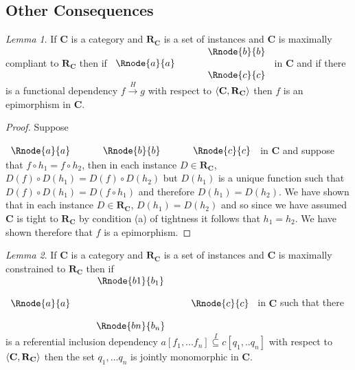 \documentclass[10pt,a4paper]{article}
\theoremstyle{remark}
\newtheorem*{lemma*}{Lemma}
\newcommand{\catc}[1][C]{\textbf{#1}}
\newcommand{\reqt}{\textbf{R}}
\newcommand{\reqtc}[1][\catc]{\reqt_{#1}}
\newcommand{\fundep}[3]{#2 \xrightarrow{#1} #3}
\begin{document}
\subsection{Other Consequences}

\begin{lemma*}
If $\catc$ is a category and $\reqtc$ is a set of instances and $\catc$ is maximally compliant to $\reqtc$
then if
$
\begin{array}{c p{0.5cm} c  }
             &&   \Rnode{b}{b} \\[0.01cm]
\Rnode{a}{a} &&                \\[0.01cm] 
             &&   \Rnode{c}{c}         
\end{array} 
$
in $\catc$ and if there is a functional dependency $\fundep{H}{f}{g}$ with respect to $\tuple{\catc,\reqtc}$ then 
$f$ is an epimorphism in $\catc$.
\end{lemma*}
\begin{proof}
Suppose 
\rule[-0.5cm]{0pt}{0.5cm} %
$
\begin{array}{c p{0.5cm} c p{0.5cm} c}
\Rnode{a}{a} &&   \Rnode{b}{b} &&   \Rnode{c}{c} 
\end{array} 
$
in $\catc$ and suppose that $f \circ h_1=f \circ h_2$, then in each instance 
 $D \in \reqtc$, $D(f) \circ D(h_1) = D(f) \circ D(h_2)$ but $D(h_1)$ is a unique function such that
$D(f) \circ D(h_1) = D(f \circ h_1)$ and therefore $D(h_1)=D(h_2)$. We have shown that in each instance $D \in \reqtc$, 
$D(h_1)=D(h_2)$ and so since we have assumed $\catc$ is tight to $\reqtc$  by condition (a) of tightness it
follows that $h_1=h_2$. We have shown therefore that $f$ is a epimorphism.
\end{proof}


\begin{lemma*}
If $\catc$ is a category and $\reqtc$ is a set of instances and $\catc$ is maximally constrained to $\reqtc$
then if 
$
\begin{array}{c p{0.25cm} c  p{0.25cm} c }
             &&   \Rnode{b1}{b_1} &&              \\[0.4cm]
\Rnode{a}{a} &&                   && \Rnode{c}{c} \\[0.4cm]
             &&   \Rnode{bn}{b_n} &&              
\end{array} 
$
in $\catc$ such that there is a referential inclusion dependency $a[f_1,...f_n] \overset{I}{\subseteq} c[q_1,..q_n]$ with respect to $\tuple{\catc,\reqtc}$ then the set $q_1,...q_n$ is jointly monomorphic in $\catc$.
\end{lemma*}
\end{document}
